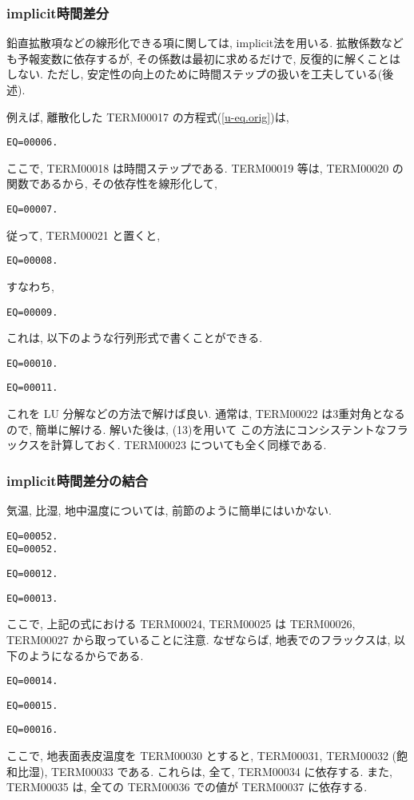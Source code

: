 \subsubsection{implicit時間差分}

鉛直拡散項などの線形化できる項に関しては, implicit法を用いる.
拡散係数なども予報変数に依存するが,
その係数は最初に求めるだけで, 反復的に解くことはしない.
ただし, 安定性の向上のために時間ステップの扱いを工夫している(後述). 

例えば, 離散化した TERM00017 の方程式(\ref{u-eq.orig})は,
%
\begin{verbatim}
EQ=00006.
\end{verbatim}
ここで, TERM00018 は時間ステップである.
TERM00019 等は, TERM00020 の関数であるから, その依存性を線形化して,
%
\begin{verbatim}
EQ=00007.
\end{verbatim}

従って, TERM00021 と置くと,
%
\begin{verbatim}
EQ=00008.
\end{verbatim}
%
すなわち,
\begin{verbatim}
EQ=00009.
\end{verbatim}

これは, 以下のような行列形式で書くことができる.
%
\begin{verbatim}
EQ=00010.
\end{verbatim}
%
\begin{verbatim}
EQ=00011.
\end{verbatim}
%
これを LU 分解などの方法で解けば良い.
通常は, TERM00022 は3重対角となるので, 簡単に解ける.
解いた後は, (13)を用いて
この方法にコンシステントなフラックスを計算しておく.
TERM00023 についても全く同様である.

\subsubsection{implicit時間差分の結合}

気温, 比湿, 地中温度については, 前節のように簡単にはいかない.
%
\begin{verbatim}
EQ=00052.
EQ=00052.
\end{verbatim}
%
\begin{verbatim}
EQ=00012.
\end{verbatim}
%
\begin{verbatim}
EQ=00013.
\end{verbatim}
%
ここで, 上記の式における TERM00024, TERM00025 は
TERM00026, TERM00027 から取っていることに注意. なぜならば,
地表でのフラックスは, 以下のようになるからである.
\begin{verbatim}
EQ=00014.
\end{verbatim}
\begin{verbatim}
EQ=00015.
\end{verbatim}
\begin{verbatim}
EQ=00016.
\end{verbatim}
ここで, 地表面表皮温度を TERM00030 とすると,
TERM00031, TERM00032 (飽和比湿), TERM00033 である.
これらは, 全て, TERM00034 に依存する.
また, TERM00035 は, 全ての TERM00036 での値が TERM00037 に依存する. 

